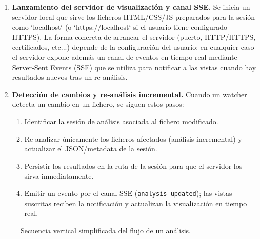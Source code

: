 \documentclass[a4paper, 12pt]{book}
\begin{document}
\begin{enumerate}
  \item \textbf{Lanzamiento del servidor de visualización y canal SSE.} Se inicia un servidor local que sirve los ficheros HTML/CSS/JS preparados para la sesión como `localhost` (o `https://localhost` si el usuario tiene configurado HTTPS). La forma concreta de arrancar el servidor (puerto, HTTP/HTTPS, certificados, etc...) depende de la configuración del usuario; en cualquier caso el servidor expone además un canal de eventos en tiempo real mediante Server‑Sent Events (SSE) que se utiliza para notificar a las vistas cuando hay resultados nuevos tras un re‑análisis.
  \item \textbf{Detección de cambios y re‑análisis incremental.} Cuando un watcher detecta un cambio en un fichero, se siguen estos pasos:
    \begin{enumerate}[label=\alph*), nosep, topsep=0pt, partopsep=0pt, parsep=0pt, itemsep=0.5ex, leftmargin=2em]
      \item Identificar la sesión de análisis asociada al fichero modificado.
      \item Re‑analizar únicamente los ficheros afectados (análisis incremental) y actualizar el JSON/metadata de la sesión.
      \item Persistir los resultados en la ruta de la sesión para que el servidor los sirva inmediatamente.
      \item Emitir un evento por el canal SSE (\texttt{analysis-updated}); las vistas suscritas reciben la notificación y actualizan la visualización en tiempo real.
    \end{enumerate}
\end{enumerate}

\begin{figure}[H]
\centering
{}
\caption{Secuencia vertical simplificada del flujo de un análisis.}
\label{fig:flujo-vertical}
\end{figure}
\end{document}
